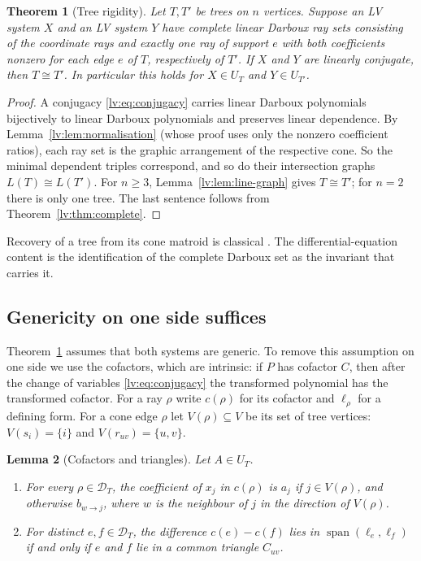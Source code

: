 \documentclass[11pt,a4paper]{article}
\newtheorem{theorem}{Theorem}[section]
\newtheorem{lemma}[theorem]{Lemma}
\theoremstyle{definition}
\theoremstyle{remark}
\begin{document}
\begin{theorem}[Tree rigidity]
\label{lv:thm:rigidity}
Let $T,T'$ be trees on $n$ vertices. Suppose an LV system $X$ and an LV system $Y$ have complete linear Darboux ray sets consisting of the coordinate rays and exactly one ray of support $e$ with both coefficients nonzero for each edge $e$ of $T$, respectively of $T'$. If $X$ and $Y$ are linearly conjugate, then $T\cong T'$. In particular this holds for $X\in U_T$ and $Y\in U_{T'}$.
\end{theorem}

\begin{proof}
A conjugacy \eqref{lv:eq:conjugacy} carries linear Darboux polynomials bijectively to linear Darboux polynomials and preserves linear dependence. By Lemma~\ref{lv:lem:normalisation} (whose proof uses only the nonzero coefficient ratios), each ray set is the graphic arrangement of the respective cone. So the minimal dependent triples correspond, and so do their intersection graphs $L(T)\cong L(T')$. For $n\geq3$, Lemma~\ref{lv:lem:line-graph} gives $T\cong T'$; for $n=2$ there is only one tree. The last sentence follows from Theorem~\ref{lv:thm:complete}.
\end{proof}

Recovery of a tree from its cone matroid is classical \cite[Remark~1.1]{lv:PR2019}. The differential-equation content is the identification of the complete Darboux set as the invariant that carries it.

\subsection{Genericity on one side suffices}

Theorem~\ref{lv:thm:rigidity} assumes that both systems are generic. To remove this assumption on one side we use the cofactors, which are intrinsic: if $P$ has cofactor $C$, then after the change of variables \eqref{lv:eq:conjugacy} the transformed polynomial has the transformed cofactor. For a ray $\rho$ write $c(\rho)$ for its cofactor and $\ell_\rho$ for a defining form. For a cone edge $\rho$ let $V(\rho)\subseteq V$ be its set of tree vertices: $V(s_i)=\{i\}$ and $V(r_{uv})=\{u,v\}$.

\begin{lemma}[Cofactors and triangles]
\label{lv:lem:cofactor}
Let $A\in U_T$.
\begin{enumerate}
\item For every $\rho\in\mathcal D_T$, the coefficient of $x_j$ in $c(\rho)$ is $a_j$ if $j\in V(\rho)$, and otherwise $b_{w\to j}$, where $w$ is the neighbour of $j$ in the direction of $V(\rho)$.
\item For distinct $e,f\in\mathcal D_T$, the difference $c(e)-c(f)$ lies in $\operatorname{span}(\ell_e,\ell_f)$ if and only if $e$ and $f$ lie in a common triangle $C_{uv}$.
\end{enumerate}
\end{lemma}
\end{document}
